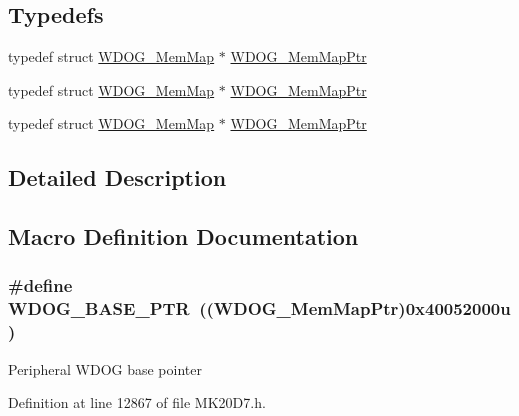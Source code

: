 \subsection*{Typedefs}
\begin{DoxyCompactItemize}
\item 
typedef struct \hyperlink{struct_w_d_o_g___mem_map}{W\+D\+O\+G\+\_\+\+Mem\+Map} $\ast$ \hyperlink{group___w_d_o_g___peripheral_gaed99974fa14a19f21a8770728ff09af3}{W\+D\+O\+G\+\_\+\+Mem\+Map\+Ptr}
\item 
typedef struct \hyperlink{struct_w_d_o_g___mem_map}{W\+D\+O\+G\+\_\+\+Mem\+Map} $\ast$ \hyperlink{group___w_d_o_g___peripheral_gaed99974fa14a19f21a8770728ff09af3}{W\+D\+O\+G\+\_\+\+Mem\+Map\+Ptr}
\item 
typedef struct \hyperlink{struct_w_d_o_g___mem_map}{W\+D\+O\+G\+\_\+\+Mem\+Map} $\ast$ \hyperlink{group___w_d_o_g___peripheral_gaed99974fa14a19f21a8770728ff09af3}{W\+D\+O\+G\+\_\+\+Mem\+Map\+Ptr}
\end{DoxyCompactItemize}


\subsection{Detailed Description}


\subsection{Macro Definition Documentation}
\subsubsection[{\texorpdfstring{W\+D\+O\+G\+\_\+\+B\+A\+S\+E\+\_\+\+P\+TR}{WDOG_BASE_PTR}}]{\setlength{\rightskip}{0pt plus 5cm}\#define W\+D\+O\+G\+\_\+\+B\+A\+S\+E\+\_\+\+P\+TR~(({\bf W\+D\+O\+G\+\_\+\+Mem\+Map\+Ptr})0x40052000u)}\hypertarget{group___w_d_o_g___peripheral_ga72fb27c7bc1ae124f180d8f2c7b9fa79}{}\label{group___w_d_o_g___peripheral_ga72fb27c7bc1ae124f180d8f2c7b9fa79}
Peripheral W\+D\+OG base pointer 

Definition at line 12867 of file M\+K20\+D7.\+h.

